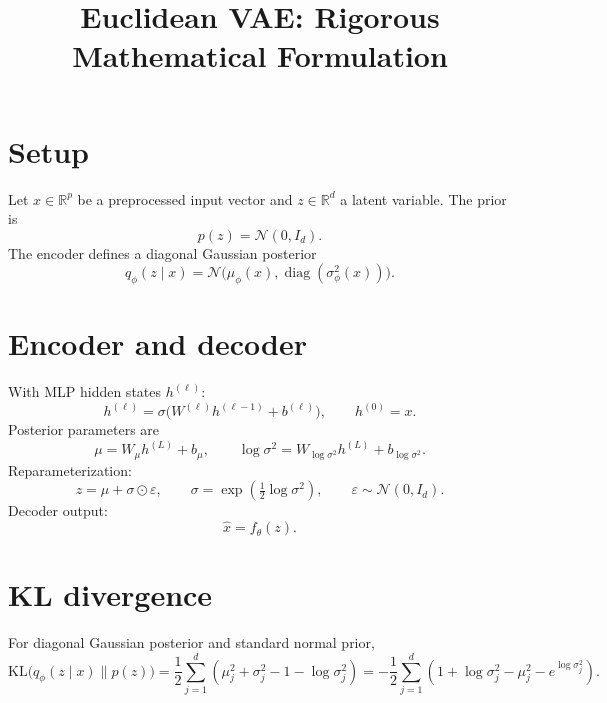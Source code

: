 \documentclass[11pt]{article}
\title{Euclidean VAE: Rigorous Mathematical Formulation}
\date{}
\begin{document}
\maketitle

\section{Setup}
Let $x\in\mathbb{R}^p$ be a preprocessed input vector and $z\in\mathbb{R}^d$ a latent variable.
The prior is
\begin{equation}
p(z)=\mathcal N(0,I_d).
\end{equation}
The encoder defines a diagonal Gaussian posterior
\begin{equation}
q_\phi(z\mid x)=\mathcal N\big(\mu_\phi(x),\operatorname{diag}(\sigma_\phi^2(x))\big).
\end{equation}

\section{Encoder and decoder}
With MLP hidden states $h^{(\ell)}$:
\begin{equation}
h^{(\ell)}=\sigma\!\big(W^{(\ell)}h^{(\ell-1)}+b^{(\ell)}\big),
\qquad h^{(0)}=x.
\end{equation}
Posterior parameters are
\begin{equation}
\mu = W_\mu h^{(L)} + b_\mu,
\qquad
\log\sigma^2 = W_{\log\sigma^2} h^{(L)} + b_{\log\sigma^2}.
\end{equation}
Reparameterization:
\begin{equation}
z=\mu+\sigma\odot\varepsilon,
\qquad
\sigma=\exp\!\left(\tfrac12\log\sigma^2\right),
\qquad
\varepsilon\sim\mathcal N(0,I_d).
\end{equation}
Decoder output:
\begin{equation}
\hat x=f_\theta(z).
\end{equation}

\section{KL divergence}
For diagonal Gaussian posterior and standard normal prior,
\begin{equation}
\mathrm{KL}\big(q_\phi(z\mid x)\|p(z)\big)
=\frac12\sum_{j=1}^d\left(\mu_j^2+\sigma_j^2-1-\log\sigma_j^2\right)
= -\frac12\sum_{j=1}^d\left(1+\log\sigma_j^2-\mu_j^2-e^{\log\sigma_j^2}\right).
\end{equation}
\end{document}
